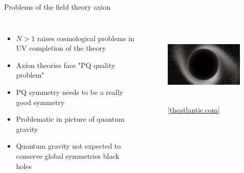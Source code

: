 \documentclass[aspectratio=1610, 9pt]{beamer}
\begin{document}
\begin{frame}{Problems of the field theory axion}
  \begin{columns}
    \begin{itemize}
      \item $N>1$ raises cosmological problems in UV completion of the theory
      \item Axion theories face "PQ quality problem"
      \item PQ symmetry needs to be a really good symmetry
      \item Problematic in picture of quantum gravity
      \item Quantum gravity not expected to conserve global symmetries \rightarrow black holes
    \end{itemize}
    \begin{figure}
    \includegraphics[height=4cm]{images/hole.png}
    \caption{\footnotesize \href{https://www.theatlantic.com/science/archive/2021/03/black-hole-cygnus-suprise/618049/}{{[theatlantic.com]}}}
    \end{figure}
  \end{columns}
\end{frame}
\end{document}
